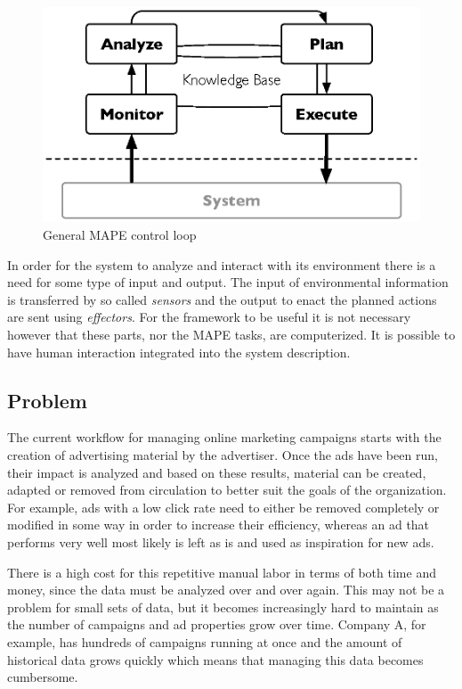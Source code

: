 \documentclass{sig-alternate}
\begin{document}
\begin{figure}[htb]
	\centering
	\includegraphics[width=\columnwidth]{mape.eps}
	\caption{General MAPE control loop}
	\label{fig:MAPE}
\end{figure}

In order for the system to analyze and interact with its environment there is a need for some type of input and output. The input of environmental information is transferred by so called \textit{sensors} and the output to enact the planned actions are sent using \textit{effectors}. For the framework to be useful it is not necessary however that these parts, nor the MAPE tasks, are computerized. It is possible to have human interaction integrated into the system description.

\subsection{Problem}
The current workflow for managing online marketing campaigns starts with the creation of advertising material by the advertiser. Once the ads have been run, their impact is analyzed and based on these results, material can be created, adapted or removed from circulation to better suit the goals of the organization. For example, ads with a low click rate need to either be removed completely or modified in some way in order to increase their efficiency, whereas an ad that performs very well most likely is left as is and used as inspiration for new ads.

There is a high cost for this repetitive manual labor in terms of both time and money, since the data must be analyzed over and over again. This may not be a problem for small sets of data, but it becomes increasingly hard to maintain as the number of campaigns and ad properties grow over time. Company A, for example, has hundreds of campaigns running at once and the amount of historical data grows quickly which means that managing this data becomes cumbersome.
\end{document}
